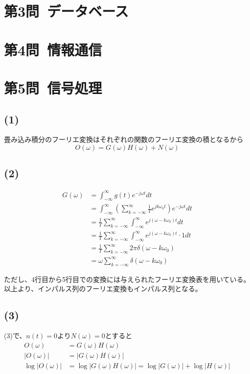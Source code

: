 \documentclass[a4paper,12pt,xelatex,ja=standard]{bxjsarticle}
\begin{document}
\section*{第3問\ データベース}

\section*{第4問\ 情報通信}

\section*{第5問\ 信号処理}
\subsection*{(1)}
畳み込み積分のフーリエ変換はそれぞれの関数のフーリエ変換の積となるから
\[
  O(\omega) = G(\omega)H(\omega) + N(\omega)
\]

\subsection*{(2)}
\begin{equation*}
  \begin{split}
    G(\omega)
      &= \int^{\infty}_{-\infty} g(t) e^{-j \omega t} dt \\
      &= \int^{\infty}_{-\infty} \left( \sum^{\infty}_{k = - \infty} \frac{1}{T} e^{j k \omega_0 t} \right)e^{-j \omega t} dt \\
      &= \frac{1}{T} \sum^{\infty}_{k = - \infty} \int^{\infty}_{-\infty} e^{j(\omega -k\omega_0)t} dt \\
      &= \frac{1}{T} \sum^{\infty}_{k = - \infty} \int^{\infty}_{-\infty} e^{j(\omega -k\omega_0)t} \cdot 1 dt \\
      &= \frac{1}{T} \sum^{\infty}_{k = - \infty} 2 \pi \delta(\omega - k \omega_0) \\
      &= \omega \sum^{\infty}_{k = - \infty} \delta(\omega - k \omega_0)
  \end{split}
\end{equation*}

ただし、4行目から5行目での変換には与えられたフーリエ変換表を用いている。
以上より、インパルス列のフーリエ変換もインパルス列となる。

\subsection*{(3)}
(3)で、$n(t) = 0$より$N(\omega) = 0$とすると
\begin{equation*}
  \begin{split}
    O(\omega) &= G(\omega) H(\omega) \\
    |O(\omega)| &= |G(\omega) H(\omega)| \\
    \log |O(\omega)| &= \log |G(\omega) H(\omega)| = \log |G(\omega)| + \log |H(\omega)| \\
  \end{split}
\end{equation*}
\end{document}
